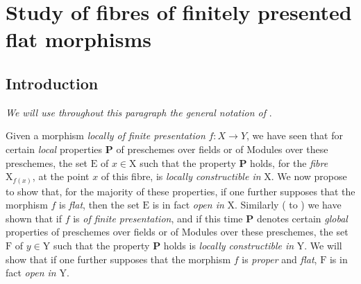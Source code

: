 \section{Study of fibres of finitely presented flat morphisms}
\label{section:IV.12}

\subsection{Introduction}
\label{subsection:IV.12.0}


\emph{We will use throughout this paragraph the general notation of} .

\begin{env}[12.0.1]
\label{IV.12.0.1}
Given a morphism \emph{locally of finite presentation} $f:X\to Y$, we have seen  that for certain \emph{local} properties $\mathbf{P}$ of preschemes over fields or of Modules over these preschemes, the set $\mathrm{E}$ of $x\in\mathrm{X}$ such that the property $\mathbf{P}$ holds, for the \emph{fibre} $\mathrm{X}_{f(x)}$, at the point $x$ of this fibre, is \emph{locally constructible in} $\mathrm{X}$.
We now propose to show that, for the majority of these properties, if one further supposes that the morphism $f$ is \emph{flat}, then the set $\mathrm{E}$ is in fact \emph{open in} $\mathrm{X}$.
Similarly ( to ) we have shown that if $f$ is \emph{of finite presentation}, and if this time $\mathbf{P}$ denotes certain \emph{global} properties of preschemes over fields or of Modules over these preschemes, the set $\mathrm{F}$ of $y\in\mathrm{Y}$ such that the property $\mathbf{P}$ holds is \emph{locally constructible in} $\mathrm{Y}$.
We will show that if one further supposes that the morphism $f$ is \emph{proper} and \emph{flat}, $\mathrm{F}$ is in fact \emph{open in} $\mathrm{Y}$.
\end{env}


